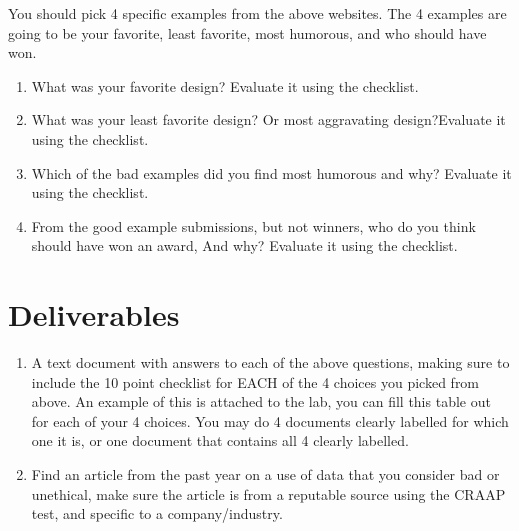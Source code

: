 \documentclass[12pt]{article}
\begin{document}
You should pick 4 specific examples from the above websites.  The 4 examples are going to be your favorite, least favorite, most humorous, and who should have won.  

    \begin{enumerate}
        \item What was your favorite design? Evaluate it using the checklist.
        \item What was your least favorite design? Or most aggravating design?Evaluate it using the checklist.
        \item Which of the bad examples did you find most humorous and why? Evaluate it using the checklist.
        \item From the good example submissions, but not winners, who do you think should have won an award, And why? Evaluate it using the checklist.
    \end{enumerate}



\section*{Deliverables}
\begin{enumerate}
    \item A text document with answers to each of the above questions, making sure to include the 10 point checklist for EACH of the 4 choices you picked from above.  An example of this is attached to the lab, you can fill this table out for each of your 4 choices.  You may do 4 documents clearly labelled for which one it is, or one document that contains all 4 clearly labelled.
    \item Find an article from the past year on a use of data that you consider bad or unethical, make sure the article is from a reputable source using the CRAAP test, and specific to a company/industry.
\end{enumerate}
\end{document}
